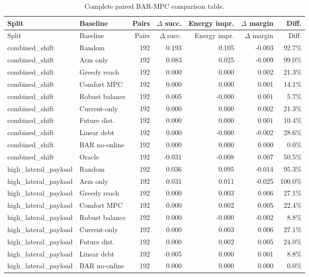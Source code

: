 \begin{longtable}{llrrrrr}
\caption{Complete paired BAR-MPC comparison table.}\label{tab:full-pairwise}\\
\toprule
Split & Baseline & Pairs & $\Delta$ succ. & Energy impr. & $\Delta$ margin & Diff. \\
\midrule
\endfirsthead
\toprule
Split & Baseline & Pairs & $\Delta$ succ. & Energy impr. & $\Delta$ margin & Diff. \\
\midrule
\endhead
combined\_shift & Random & 192 & 0.193 & 0.105 & -0.003 & 92.7\% \\
combined\_shift & Arm only & 192 & 0.083 & 0.025 & -0.009 & 99.0\% \\
combined\_shift & Greedy reach & 192 & 0.000 & 0.000 & 0.002 & 21.3\% \\
combined\_shift & Comfort MPC & 192 & 0.000 & 0.000 & 0.001 & 14.1\% \\
combined\_shift & Robust balance & 192 & 0.005 & -0.000 & 0.001 & 5.7\% \\
combined\_shift & Current-only & 192 & 0.000 & 0.000 & 0.002 & 21.3\% \\
combined\_shift & Future dist. & 192 & 0.000 & 0.000 & 0.001 & 10.4\% \\
combined\_shift & Linear debt & 192 & 0.000 & -0.000 & -0.002 & 28.6\% \\
combined\_shift & BAR no-online & 192 & 0.000 & 0.000 & 0.000 & 0.0\% \\
combined\_shift & Oracle & 192 & -0.031 & -0.008 & 0.007 & 50.5\% \\
high\_lateral\_payload & Random & 192 & 0.036 & 0.095 & -0.014 & 95.3\% \\
high\_lateral\_payload & Arm only & 192 & 0.031 & 0.011 & -0.025 & 100.0\% \\
high\_lateral\_payload & Greedy reach & 192 & 0.000 & 0.003 & 0.006 & 27.1\% \\
high\_lateral\_payload & Comfort MPC & 192 & 0.000 & 0.002 & 0.005 & 22.4\% \\
high\_lateral\_payload & Robust balance & 192 & 0.000 & -0.000 & -0.002 & 8.8\% \\
high\_lateral\_payload & Current-only & 192 & 0.000 & 0.003 & 0.006 & 27.1\% \\
high\_lateral\_payload & Future dist. & 192 & 0.000 & 0.002 & 0.005 & 24.0\% \\
high\_lateral\_payload & Linear debt & 192 & -0.005 & 0.000 & 0.001 & 8.8\% \\
high\_lateral\_payload & BAR no-online & 192 & 0.000 & 0.000 & 0.000 & 0.0\% \\

\end{longtable}
